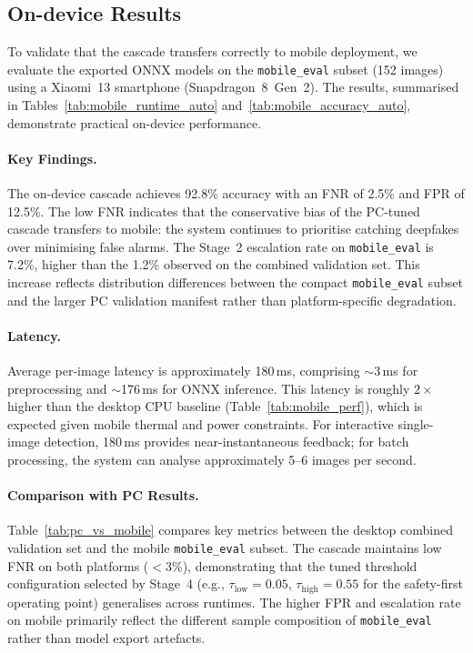 \subsection{On-device Results}
\label{sec:ondevice_results}

To validate that the cascade transfers correctly to mobile deployment, we evaluate the exported ONNX models on the \texttt{mobile\_eval} subset (152 images) using a Xiaomi~13 smartphone (Snapdragon~8~Gen~2). The results, summarised in Tables~\ref{tab:mobile_runtime_auto} and~\ref{tab:mobile_accuracy_auto}, demonstrate practical on\hyp device performance.

\paragraph{Key Findings.}
The on\hyp device cascade achieves 92.8\% accuracy with an FNR of 2.5\% and FPR of 12.5\%. The low FNR indicates that the conservative bias of the PC\hyp tuned cascade transfers to mobile: the system continues to prioritise catching deepfakes over minimising false alarms. The Stage~2 escalation rate on \texttt{mobile\_eval} is 7.2\%, higher than the 1.2\% observed on the combined validation set. This increase reflects distribution differences between the compact \texttt{mobile\_eval} subset and the larger PC validation manifest rather than platform\hyp specific degradation.

\paragraph{Latency.}
Average per\hyp image latency is approximately 180\,ms, comprising $\sim$3\,ms for preprocessing and $\sim$176\,ms for ONNX inference. This latency is roughly $2\times$ higher than the desktop CPU baseline (Table~\ref{tab:mobile_perf}), which is expected given mobile thermal and power constraints. For interactive single\hyp image detection, 180\,ms provides near\hyp instantaneous feedback; for batch processing, the system can analyse approximately 5--6 images per second.

\paragraph{Comparison with PC Results.}
Table~\ref{tab:pc_vs_mobile} compares key metrics between the desktop combined validation set and the mobile \texttt{mobile\_eval} subset. The cascade maintains low FNR on both platforms ($<$3\%), demonstrating that the tuned threshold configuration selected by Stage~4 (e.g., $\tau_\mathrm{low}=0.05$, $\tau_\mathrm{high}=0.55$ for the safety\hyp first operating point) generalises across runtimes. The higher FPR and escalation rate on mobile primarily reflect the different sample composition of \texttt{mobile\_eval} rather than model export artefacts.

